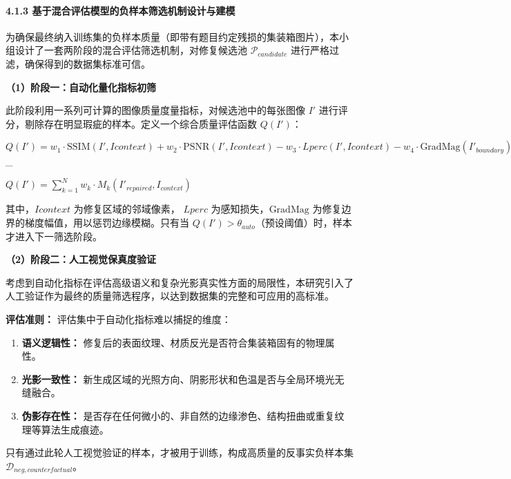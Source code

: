 \documentclass[
]{article}
\begin{document}
\paragraph{\texorpdfstring{\textbf{4.1.3
基于混合评估模型的负样本筛选机制设计与建模}}{4.1.3 基于混合评估模型的负样本筛选机制设计与建模}}\label{413-ux57faux4e8eux6df7ux5408ux8bc4ux4f30ux6a21ux578bux7684ux8d1fux6837ux672cux7b5bux9009ux673aux5236ux8bbeux8ba1ux4e0eux5efaux6a21}

为确保最终纳入训练集的负样本质量（即带有题目约定残损的集装箱图片），本小组设计了一套两阶段的混合评估筛选机制，对修复候选池
\(\mathcal{P}_{candidate}\) 进行严格过滤，确保得到的数据集标准可信。

\textbf{（1）阶段一：自动化量化指标初筛}

此阶段利用一系列可计算的图像质量度量指标，对候选池中的每张图像 \(I'\)
进行评分，剔除存在明显瑕疵的样本。定义一个综合质量评估函数 \(Q(I')\)：

\(Q(I') = w_1 \cdot \text{SSIM}(I', I{context}) + w_2 \cdot \text{PSNR}(I', I{context}) - w_3 \cdot L{perc}(I', I{context}) - w_4 \cdot \text{GradMag}(I'_{boundary})\)
\_

\(Q(I') = \sum_{k=1}^{N} w_k \cdot M_k(I'_{repaired}, I_{context})\)

其中，\(I{context}\) 为修复区域的邻域像素， \(L{perc}\)
为感知损失，\( \text{GradMag}\)
为修复边界的梯度幅值，用以惩罚边缘模糊。只有当
\(Q(I') > \theta_{auto}\)（预设阈值）时，样本才进入下一筛选阶段。

\textbf{（2）阶段二：人工视觉保真度验证}

考虑到自动化指标在评估高级语义和复杂光影真实性方面的局限性，本研究引入了人工验证作为最终的质量筛选程序，以达到数据集的完整和可应用的高标准。

\textbf{评估准则：} 评估集中于自动化指标难以捕捉的维度：

\begin{enumerate}
\def\labelenumi{\arabic{enumi}.}
\item
  \textbf{语义逻辑性：}
  修复后的表面纹理、材质反光是否符合集装箱固有的物理属性。
\item
  \textbf{光影一致性：}
  新生成区域的光照方向、阴影形状和色温是否与全局环境光无缝融合。
\item
  \textbf{伪影存在性：}
  是否存在任何微小的、非自然的边缘渗色、结构扭曲或重复纹理等算法生成痕迹。
\end{enumerate}

只有通过此轮人工视觉验证的样本，才被用于训练，构成高质量的反事实负样本集
\(\mathcal{D}_{neg, counterfactual}\)。
\end{document}
